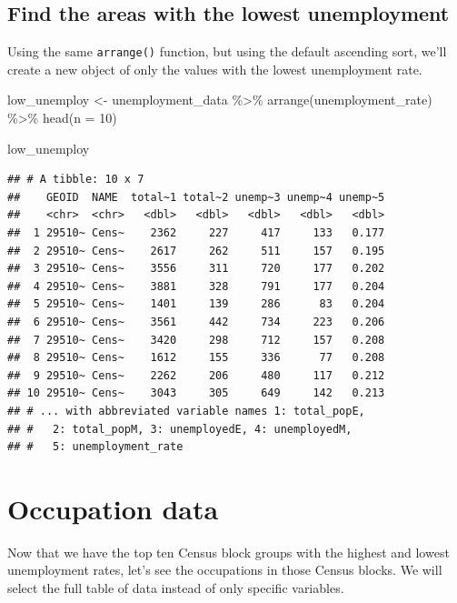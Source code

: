 \documentclass[
  krantz2]{krantz}
\makeatletter
\newenvironment{Shaded}{\begin{snugshade}}{\end{snugshade}}
\newcommand{\AttributeTok}[1]{\textcolor[rgb]{0.61,0.61,0.61}{#1}}
\newcommand{\DecValTok}[1]{\textcolor[rgb]{0.06,0.06,0.06}{#1}}
\newcommand{\FunctionTok}[1]{\textcolor[rgb]{0,0,0}{#1}}
\newcommand{\NormalTok}[1]{#1}
\newcommand{\OtherTok}[1]{\textcolor[rgb]{0.37,0.37,0.37}{#1}}
\newcommand{\SpecialCharTok}[1]{\textcolor[rgb]{0,0,0}{#1}}
\newenvironment{kframe}{%
\medskip{}
\setlength{\fboxsep}{.8em}
 \def\at@end@of@kframe{}%
 \ifinner\ifhmode%
  \def\at@end@of@kframe{\end{minipage}}%
  \begin{minipage}{\columnwidth}%
 \fi\fi%
 \def\FrameCommand##1{\hskip\@totalleftmargin \hskip-\fboxsep
 \colorbox{shadecolor}{##1}\hskip-\fboxsep
     \hskip-\linewidth \hskip-\@totalleftmargin \hskip\columnwidth}%
 \MakeFramed {\advance\hsize-\width
   \@totalleftmargin\z@ \linewidth\hsize
   \@setminipage}}%
 {\par\unskip\endMakeFramed%
 \at@end@of@kframe}
\renewenvironment{Shaded}{\begin{kframe}}{\end{kframe}}
\makeatother
\begin{document}
\hypertarget{find-the-areas-with-the-lowest-unemployment}{%
\subsection{Find the areas with the lowest unemployment}\label{find-the-areas-with-the-lowest-unemployment}}

Using the same \texttt{arrange()} function, but using the default ascending sort, we'll create a new object of only the values with the lowest unemployment rate.

\begin{Shaded}
\begin{Highlighting}[]
\NormalTok{low\_unemploy }\OtherTok{\textless{}{-}}\NormalTok{ unemployment\_data }\SpecialCharTok{\%\textgreater{}\%}
  \FunctionTok{arrange}\NormalTok{(unemployment\_rate) }\SpecialCharTok{\%\textgreater{}\%}
  \FunctionTok{head}\NormalTok{(}\AttributeTok{n =} \DecValTok{10}\NormalTok{)}

\NormalTok{low\_unemploy}
\end{Highlighting}
\end{Shaded}

\begin{verbatim}
## # A tibble: 10 x 7
##    GEOID  NAME  total~1 total~2 unemp~3 unemp~4 unemp~5
##    <chr>  <chr>   <dbl>   <dbl>   <dbl>   <dbl>   <dbl>
##  1 29510~ Cens~    2362     227     417     133   0.177
##  2 29510~ Cens~    2617     262     511     157   0.195
##  3 29510~ Cens~    3556     311     720     177   0.202
##  4 29510~ Cens~    3881     328     791     177   0.204
##  5 29510~ Cens~    1401     139     286      83   0.204
##  6 29510~ Cens~    3561     442     734     223   0.206
##  7 29510~ Cens~    3420     298     712     157   0.208
##  8 29510~ Cens~    1612     155     336      77   0.208
##  9 29510~ Cens~    2262     206     480     117   0.212
## 10 29510~ Cens~    3043     305     649     142   0.213
## # ... with abbreviated variable names 1: total_popE,
## #   2: total_popM, 3: unemployedE, 4: unemployedM,
## #   5: unemployment_rate
\end{verbatim}

\hypertarget{occupation-data}{%
\section{Occupation data}\label{occupation-data}}

Now that we have the top ten Census block groups with the highest and lowest unemployment rates, let's see the occupations in those Census blocks. We will select the full table of data instead of only specific variables.
\end{document}
